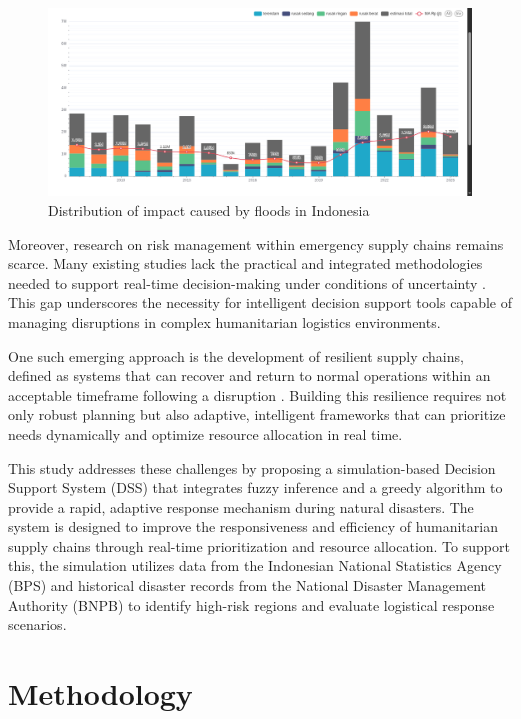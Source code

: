 \documentclass[journal,final,a4paper,twoside,11pt]{IEEEtran}
\begin{document}
\begin{figure}[htbp]
    \centerline{\includegraphics[width=0.8\linewidth]{fig2.png}}
    \caption{Distribution of impact caused by floods in Indonesia}
    \label{fig:floodimpact}
\end{figure}

{}
\newline

Moreover, research on risk management within emergency supply chains remains scarce. Many existing studies lack the practical and integrated methodologies needed to support real-time decision-making under conditions of uncertainty \cite{chukwuka2023comprehensive}. This gap underscores the necessity for intelligent decision support tools capable of managing disruptions in complex humanitarian logistics environments.

One such emerging approach is the development of resilient supply chains, defined as systems that can recover and return to normal operations within an acceptable timeframe following a disruption \cite{orengo2022food}. Building this resilience requires not only robust planning but also adaptive, intelligent frameworks that can prioritize needs dynamically and optimize resource allocation in real time.

This study addresses these challenges by proposing a simulation-based Decision Support System (DSS) that integrates fuzzy inference and a greedy algorithm to provide a rapid, adaptive response mechanism during natural disasters. The system is designed to improve the responsiveness and efficiency of humanitarian supply chains through real-time prioritization and resource allocation. To support this, the simulation utilizes data from the Indonesian National Statistics Agency (BPS) and historical disaster records from the National Disaster Management Authority (BNPB) to identify high-risk regions and evaluate logistical response scenarios.



\section{Methodology}
\end{document}
